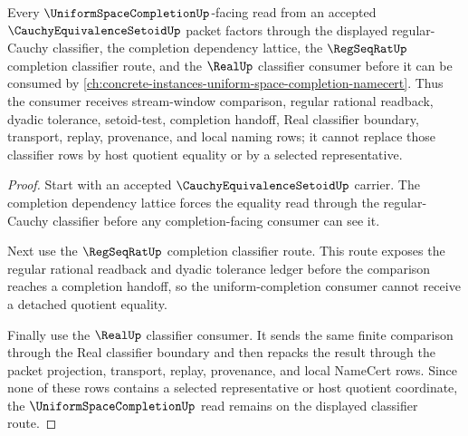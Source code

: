 \begin{theorem}
\label{thm:cauchy-equivalence-setoid-uniform-completion-consumer}
Every $\UniformSpaceCompletionUp$-facing read from an accepted $\CauchyEquivalenceSetoidUp$ packet factors through the displayed regular-Cauchy classifier, the completion dependency lattice, the $\RegSeqRatUp$ completion classifier route, and the $\RealUp$ classifier consumer before it can be consumed by \autoref{ch:concrete-instances-uniform-space-completion-namecert}. Thus the consumer receives stream-window comparison, regular rational readback, dyadic tolerance, setoid-test, completion handoff, Real classifier boundary, transport, replay, provenance, and local naming rows; it cannot replace those classifier rows by host quotient equality or by a selected representative.
\end{theorem}
\begin{proof}
Start with an accepted $\CauchyEquivalenceSetoidUp$ carrier. The completion dependency lattice forces the equality read through the regular-Cauchy classifier before any completion-facing consumer can see it.

Next use the $\RegSeqRatUp$ completion classifier route. This route exposes the regular rational readback and dyadic tolerance ledger before the comparison reaches a completion handoff, so the uniform-completion consumer cannot receive a detached quotient equality.

Finally use the $\RealUp$ classifier consumer. It sends the same finite comparison through the Real classifier boundary and then repacks the result through the packet projection, transport, replay, provenance, and local NameCert rows. Since none of these rows contains a selected representative or host quotient coordinate, the $\UniformSpaceCompletionUp$ read remains on the displayed classifier route.
\end{proof}
